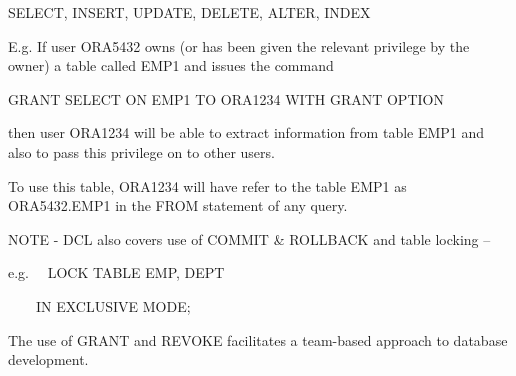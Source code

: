 SELECT, INSERT, UPDATE, DELETE, ALTER, INDEX

E.g. If user ORA5432 owns (or has been given the relevant privilege by the owner) a table called EMP1 and issues the command

 GRANT SELECT ON EMP1 TO ORA1234 WITH GRANT OPTION

then user ORA1234 will be able to extract information from table EMP1 and also to pass this privilege on to other users.

To use this table, ORA1234 will have refer to the table EMP1 as ORA5432.EMP1 in the FROM statement of any query.

NOTE - DCL also covers use of COMMIT \& ROLLBACK and table locking --

e.g. \ \ LOCK TABLE EMP, DEPT

 \ \ \ \ IN EXCLUSIVE MODE;

The use of GRANT and REVOKE facilitates a team-based approach to database development. 
